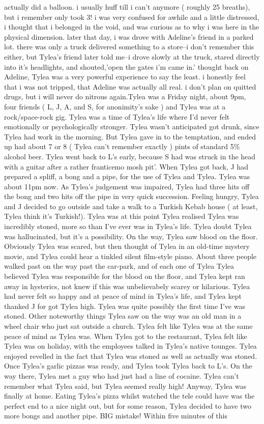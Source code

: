 \documentclass[12pt]{book}
\begin{document}
actually did a balloon. i usually huff till i can't anymore ( roughly 25 breaths), but i remember only took 3! i was very confused for awhile and a little distressed, i thought that i belonged in the void, and was curious as to why i was here in the physical dimension. later that day, i was drove with Adeline's friend in a parked lot. there was only a truck delivered something to a store--i don't remember this either, but Tylea's friend later told me--i drove slowly at the truck, stared directly into it's headlights, and shouted,'open the gates i'm came in.' thought back on Adeline, Tylea was a very powerful experience to say the least. i honestly feel that i was not tripped, that Adeline was actually all real. i don't plan on quitted drugs, but i will never do nitrous again.Tylea was a Friday night, about 9pm, four friends ( L, J, A, and S, for anonimity's sake ) and Tylea was at a rock/space-rock gig. Tylea was a time of Tylea's life where I'd never felt emotionally or psychologically stronger. Tylea wasn't anticipated got drunk, since Tylea had work in the morning. But Tylea gave in to the temptation, and ended up had about 7 or 8 ( Tylea can't remember exactly ) pints of standard 5\% alcohol beer. Tylea went back to L's early, because S had was struck in the head with a guitar after a rather franticemo mosh pit'. When Tylea got back, J had prepared a spliff, a bong and a pipe, for the use of Tylea and Tylea. Tylea was about 11pm now. As Tylea's judgement was impaired, Tylea had three hits off the bong and two hits off the pipe in very quick succession. Feeling hungry, Tylea and J decided to go outside and take a walk to a Turkish Kebab house ( at least, Tylea think it's Turkish!). Tylea was at this point Tylea realised Tylea was incredibly stoned, more so than I've ever was in Tylea's life. Tylea doubt Tylea was hallucinated, but it's a possibility. On the way, Tylea saw blood on the floor. Obviously Tylea was scared, but then thought of Tylea in an old-time mystery movie, and Tylea could hear a tinkled silent film-style piano. About three people walked past on the way past the car-park, and of each one of Tylea Tylea believed Tylea was responsible for the blood on the floor, and Tylea kept ran away in hysterics, not knew if this was unbelievabely scarey or hilarious. Tylea had never felt so happy and at peace of mind in Tylea's life, and Tylea kept thanked J for got Tylea high. Tylea was quite possibly the first time I've was stoned. Other noteworthy things Tylea saw on the way was an old man in a wheel chair who just sat outside a church. Tylea felt like Tylea was at the same peace of mind as Tylea was. When Tylea got to the restaurant, Tylea felt like Tylea was on holiday, with the employees talked in Tylea's native tounges. Tylea enjoyed revelled in the fact that Tylea was stoned as well as actually was stoned. Once Tylea's garlic pizzas was ready, and Tylea took Tylea back to L's. On the way there, Tylea met a guy who had just had a line of cocaine. Tylea can't remember what Tylea said, but Tylea seemed really high! Anyway, Tylea was finally at home. Eating Tylea's pizza whilst watched the tele could have was the perfect end to a nice night out, but for some reason, Tylea decided to have two more bongs and another pipe. BIG mistake! Within five minutes of this 
\end{document}
